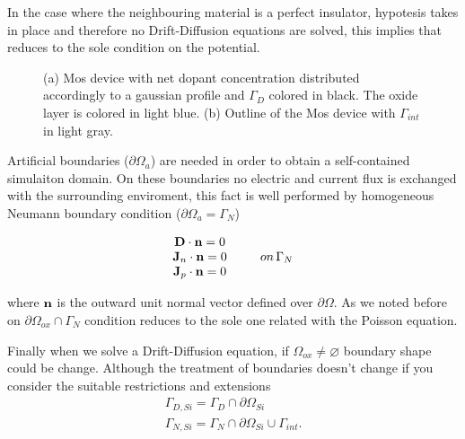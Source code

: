 In the case where the neighbouring material is a perfect insulator, hypotesis  takes in place and therefore no Drift-Diffusion equations are solved, this implies that  reduces to the sole condition on the potential.

\begin{figure}[!b]
\centering
{}
\caption{(a) Mos device with net dopant concentration distributed accordingly to a gaussian profile and $\Gamma_D$ colored in black. The oxide layer is colored in light blue. (b) Outline of the Mos device with $\Gamma_{int}$ in light gray. }
\end{figure}

Artificial boundaries ($\partial \Omega_a$) are needed in order to obtain a self-contained simulaiton domain.  On these boundaries no electric and current flux is exchanged with the surrounding enviroment, this fact is well performed by homogeneous Neumann boundary condition ($\partial \Omega_a = \Gamma_N$)

\begin{equation}
\label{eq: neumann boundar condition}
\begin{array}{cc}
\vect{D}\cdot \vect{n} = 0 & \\
\vect{J}_n \cdot \vect{n} = 0 & \psp{10} on \, \Gamma_N \\
\vect{J}_p \cdot \vect{n} = 0 & 
\end{array}
\end{equation}

where $\mathbf{n}$ is the outward unit normal vector defined over $\partial \Omega$. 
As we noted before on $\partial \Omega_{ox} \cap \Gamma_N$ condition  reduces to the sole one related with the Poisson equation.

Finally when we solve a Drift-Diffusion equation, if $\Omega_{ox} \neq \varnothing$ boundary shape could be change. Although the treatment of boundaries doesn't change if you consider the suitable restrictions and extensions
\begin{equation}
\begin{array}{c}
\Gamma_{D,Si} = \Gamma_D \cap \partial \Omega_{Si} \\
\Gamma_{N,Si} = \Gamma_N \cap \partial \Omega_{Si} \cup \Gamma_{int}.
\end{array}
\end{equation}

